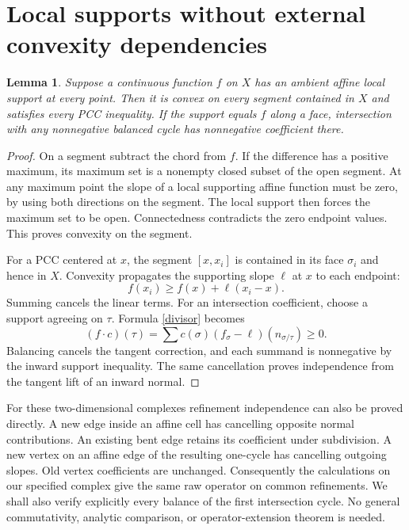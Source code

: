 \documentclass[11pt]{article}
\newtheorem{lemma}[theorem]{Lemma}
\begin{document}
\section{Local supports without external convexity dependencies}
\begin{lemma}\label{support}
Suppose a continuous function $f$ on $X$ has an ambient affine local support at every point. Then it is convex on every segment contained in $X$ and satisfies every PCC inequality. If the support equals $f$ along a face, intersection with any nonnegative balanced cycle has nonnegative coefficient there.
\end{lemma}
\begin{proof}
On a segment subtract the chord from $f$. If the difference has a positive maximum, its maximum set is a nonempty closed subset of the open segment. At any maximum point the slope of a local supporting affine function must be zero, by using both directions on the segment. The local support then forces the maximum set to be open. Connectedness contradicts the zero endpoint values. This proves convexity on the segment.

For a PCC centered at $x$, the segment $[x,x_i]$ is contained in its face $\sigma_i$ and hence in $X$. Convexity propagates the supporting slope $\ell$ at $x$ to each endpoint:
\[f(x_i)\geq f(x)+\ell(x_i-x).\]
Summing cancels the linear terms. For an intersection coefficient, choose a support agreeing on $\tau$. Formula \eqref{divisor} becomes
\[(f\cdot c)(\tau)=\sum c(\sigma)(f_\sigma-\ell)(n_{\sigma/\tau})\geq0.\]
Balancing cancels the tangent correction, and each summand is nonnegative by the inward support inequality. The same cancellation proves independence from the tangent lift of an inward normal.
\end{proof}

For these two-dimensional complexes refinement independence can also be proved directly. A new edge inside an affine cell has cancelling opposite normal contributions. An existing bent edge retains its coefficient under subdivision. A new vertex on an affine edge of the resulting one-cycle has cancelling outgoing slopes. Old vertex coefficients are unchanged. Consequently the calculations on our specified complex give the same raw operator on common refinements. We shall also verify explicitly every balance of the first intersection cycle. No general commutativity, analytic comparison, or operator-extension theorem is needed.
\end{document}
